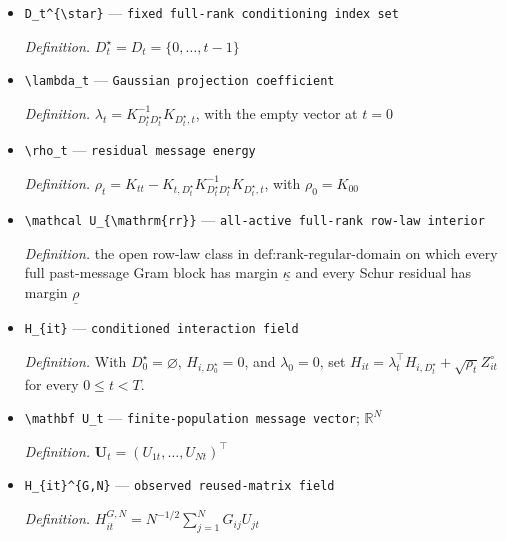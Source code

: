 \documentclass{article}
\begin{document}
\begin{itemize}
  \par\smallskip\noindent\emph{Definition.} \(D_t=\{0,\ldots,t-1\}\), with \(D_0=\varnothing\)
  \item \texttt{D\_\allowbreak{}t\textasciicircum{}\{\textbackslash{}\allowbreak{}star\}\allowbreak{}} --- \texttt{fixed full-\allowbreak{}rank conditioning index set}
  \par\smallskip\noindent\emph{Definition.} \(D_t^{\star}=D_t=\{0,\ldots,t-1\}\)
  \item \texttt{\textbackslash{}\allowbreak{}lambda\_\allowbreak{}t} --- \texttt{Gaussian projection coefficient}
  \par\smallskip\noindent\emph{Definition.} \(\lambda_t=K_{D_t^{\star}D_t^{\star}}^{-1}K_{D_t^{\star},t}\), with the empty vector at \(t=0\)
  \item \texttt{\textbackslash{}\allowbreak{}rho\_\allowbreak{}t} --- \texttt{residual message energy}
  \par\smallskip\noindent\emph{Definition.} \(\rho_t=K_{tt}-K_{t,D_t^{\star}}K_{D_t^{\star}D_t^{\star}}^{-1}K_{D_t^{\star},t}\), with \(\rho_0=K_{00}\)
  \item \texttt{\textbackslash{}\allowbreak{}mathcal U\_\allowbreak{}\{\textbackslash{}\allowbreak{}mathrm\{rr\}\allowbreak{}\}\allowbreak{}} --- \texttt{all-\allowbreak{}active full-\allowbreak{}rank row-\allowbreak{}law interior}
  \par\smallskip\noindent\emph{Definition.} the open row-law class in \(\text{def:rank-regular-domain}\) on which every full past-message Gram block has margin \(\underline\kappa\) and every Schur residual has margin \(\underline\rho\)
  \item \texttt{H\_\allowbreak{}\{it\}\allowbreak{}} --- \texttt{conditioned interaction field}
  \par\smallskip\noindent\emph{Definition.} With \(D_0^{\star}=\varnothing\), \(H_{i,D_0^{\star}}=0\), and \(\lambda_0=0\), set \(H_{it}=\lambda_t^{\top}H_{i,D_t^{\star}}+\sqrt{\rho_t}Z_{it}^{\circ}\) for every \(0\le t<T\).
  \item \texttt{\textbackslash{}\allowbreak{}mathbf U\_\allowbreak{}t} --- \texttt{finite-\allowbreak{}population message vector}; \(\mathbb R^N\)
  \par\smallskip\noindent\emph{Definition.} \(\mathbf U_t=(U_{1t},\ldots,U_{Nt})^{\top}\)
  \item \texttt{H\_\allowbreak{}\{it\}\allowbreak{}\textasciicircum{}\{G,\allowbreak{}N\}\allowbreak{}} --- \texttt{observed reused-\allowbreak{}matrix field}
  \par\smallskip\noindent\emph{Definition.} \(H_{it}^{G,N}=N^{-1/2}\sum_{j=1}^NG_{ij}U_{jt}\)

\end{itemize}
\end{document}
